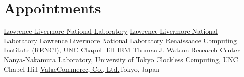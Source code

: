 \section{Appointments}
		{\href{http://www.llnl.gov}{Lawrence Livermore National Laboratory}}{}{}
		{\href{http://www.llnl.gov}{Lawrence Livermore National Laboratory}}{}{}
		{\href{http://www.llnl.gov}{Lawrence Livermore National Laboratory}}{}{}
		{\href{http://www.renci.org}{Renaissance Computing Institute (RENCI)}, UNC Chapel Hill}{}{}{}
		{\href{http://www.watson.ibm.com}{IBM Thomas J. Watson Research Center}}{}{}{}
		{\href{http://www.hal.rcast.u-tokyo.ac.jp/}{Nanya-Nakamura Laboratory}, University of Tokyo}{}{}{}
		{\href{http://www.cs.unc.edu/~montek/}{Clockless Computing}, UNC Chapel Hill}{}{}{}
		{\href{http://valuecommerce.com}{ValueCommerce, Co., Ltd.}}{Tokyo, Japan}{}{}
